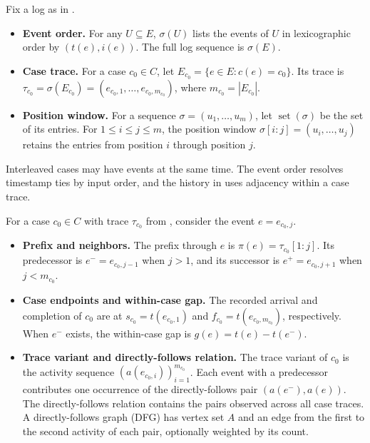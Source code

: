 \begin{Definition}\label{def:ordered-log}
Fix a log as in .
\begin{itemize}
  \item \textbf{Event order.} For any $U\subseteq E$, $\sigma(U)$ lists the events of $U$ in lexicographic order by $(t(e),i(e))$. The full log sequence is $\sigma(E)$.
  \item \textbf{Case trace.} For a case $c_0\in C$, let $E_{c_0}=\{e\in E:c(e)=c_0\}$. Its trace is $\tau_{c_0}=\sigma(E_{c_0})=(e_{c_0,1},\ldots,e_{c_0,m_{c_0}})$, where $m_{c_0}=|E_{c_0}|$.
  \item \textbf{Position window.} For a sequence $\sigma=(u_1,\ldots,u_m)$, let $\operatorname{set}(\sigma)$ be the set of its entries. For $1\leq i\leq j\leq m$, the position window $\sigma[i:j]=(u_i,\ldots,u_j)$ retains the entries from position $i$ through position $j$.
\end{itemize}
\end{Definition}

Interleaved cases may have events at the same time. The event order resolves timestamp ties by input order, and the history in  uses adjacency within a case trace.

\begin{Definition}\label{def:case-history}
For a case $c_0\in C$ with trace $\tau_{c_0}$ from , consider the event $e=e_{c_0,j}$.
\begin{itemize}
  \item \textbf{Prefix and neighbors.} The prefix through $e$ is $\pi(e)=\tau_{c_0}[1:j]$. Its predecessor is $e^-=e_{c_0,j-1}$ when $j>1$, and its successor is $e^+=e_{c_0,j+1}$ when $j<m_{c_0}$.
  \item \textbf{Case endpoints and within-case gap.} The recorded arrival and completion of $c_0$ are at $s_{c_0}=t(e_{c_0,1})$ and $f_{c_0}=t(e_{c_0,m_{c_0}})$, respectively. When $e^-$ exists, the within-case gap is $g(e)=t(e)-t(e^-)$.
  \item \textbf{Trace variant and directly-follows relation.} The trace variant of $c_0$ is the activity sequence $(a(e_{c_0,i}))_{i=1}^{m_{c_0}}$. Each event with a predecessor contributes one occurrence of the directly-follows pair $(a(e^-),a(e))$. The directly-follows relation contains the pairs observed across all case traces. A directly-follows graph (DFG) has vertex set $A$ and an edge from the first to the second activity of each pair, optionally weighted by its count.
\end{itemize}
\end{Definition}

